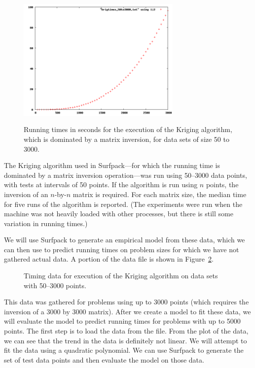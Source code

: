 \documentclass{article}
\begin{document}
\begin{figure}[htbp]
  \centering 
  \includegraphics[width=8cm]{TimingMatrixOp/kriging_times_50to3000.png}
  \label{fig:kriging_times}
  \caption {Running times in seconds for the execution of the Kriging algorithm, which is dominated by a matrix inversion, for data sets of size 50 to 3000.} 
\end{figure}

The Kriging algorithm used in Surfpack---for which the running time is
dominated by a matrix inversion operation---was run using 50--3000 data points,
with tests at intervals of 50 points.  If the algorithm is run using $n$
points, the inversion of an $n$-by-$n$ matrix is required.  For each matrix
size, the median time for five runs of the algorithm is reported.  (The
experiments were run when the machine was not heavily loaded with other
processes, but there is still some variation in running times.)

We will use Surfpack to generate an empirical model from these data, which we
can then use to predict running times on problem sizes for which we have not
gathered actual data.  A portion of the data file is shown in Figure~\ref{fig:timing_data_extract}.

\begin{figure}[htbp]
  \centering
  \begin{bigbox}
	\begin{small}
		
 	\end{small}
  \end{bigbox}
  \label{fig:timing_data_extract}
  \caption{ Timing data for execution of the Kriging algorithm on data sets with 50--3000 points.}
\end{figure}

This data was gathered for problems using up to 3000 points (which requires the
inversion of a 3000 by 3000 matrix).  After we create a model to fit these data,
we will evaluate the model to predict running times for problems with up to 5000
points.  The first step is to load the data from the file.
From the plot of the data, we can see that the trend in the data is definitely
not linear.  We will attempt to fit the data using a quadratic polynomial.
We can use Surfpack to generate the set of test data points and then evaluate
the model on those data.

\end{document}
